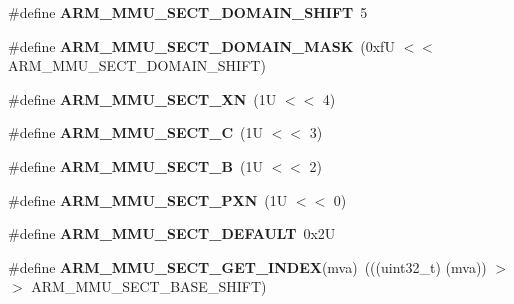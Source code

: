 \begin{DoxyCompactItemize}
\item 
\mbox{\label{group__RTEMSScoreCPUARMCP15_ga8d605c618c7295f01c30cd6ad2474426}} 
\#define {\bfseries A\+R\+M\+\_\+\+M\+M\+U\+\_\+\+S\+E\+C\+T\+\_\+\+D\+O\+M\+A\+I\+N\+\_\+\+S\+H\+I\+FT}~5
\item 
\mbox{\label{group__RTEMSScoreCPUARMCP15_ga277901cc0c1bc04e2191616e1b4e6fb5}} 
\#define {\bfseries A\+R\+M\+\_\+\+M\+M\+U\+\_\+\+S\+E\+C\+T\+\_\+\+D\+O\+M\+A\+I\+N\+\_\+\+M\+A\+SK}~(0xf\+U $<$$<$ A\+R\+M\+\_\+\+M\+M\+U\+\_\+\+S\+E\+C\+T\+\_\+\+D\+O\+M\+A\+I\+N\+\_\+\+S\+H\+I\+F\+T)
\item 
\mbox{\label{group__RTEMSScoreCPUARMCP15_gab307c4a376b707f0f7cfead169fd044f}} 
\#define {\bfseries A\+R\+M\+\_\+\+M\+M\+U\+\_\+\+S\+E\+C\+T\+\_\+\+XN}~(1\+U $<$$<$ 4)
\item 
\mbox{\label{group__RTEMSScoreCPUARMCP15_gadd8c8bbe71b02dd97b5700af1ee6c9d4}} 
\#define {\bfseries A\+R\+M\+\_\+\+M\+M\+U\+\_\+\+S\+E\+C\+T\+\_\+C}~(1\+U $<$$<$ 3)
\item 
\mbox{\label{group__RTEMSScoreCPUARMCP15_ga877b1fcf2fe5770a02682490e99441bf}} 
\#define {\bfseries A\+R\+M\+\_\+\+M\+M\+U\+\_\+\+S\+E\+C\+T\+\_\+B}~(1\+U $<$$<$ 2)
\item 
\mbox{\label{group__RTEMSScoreCPUARMCP15_ga074bffe7d934a5057cc9da19adec1302}} 
\#define {\bfseries A\+R\+M\+\_\+\+M\+M\+U\+\_\+\+S\+E\+C\+T\+\_\+\+P\+XN}~(1\+U $<$$<$ 0)
\item 
\mbox{\label{group__RTEMSScoreCPUARMCP15_gac78507eae124073eda5802dd072b90ae}} 
\#define {\bfseries A\+R\+M\+\_\+\+M\+M\+U\+\_\+\+S\+E\+C\+T\+\_\+\+D\+E\+F\+A\+U\+LT}~0x2U
\item 
\mbox{\label{group__RTEMSScoreCPUARMCP15_ga79711b4e43057d80bb4d3396e1509f84}} 
\#define {\bfseries A\+R\+M\+\_\+\+M\+M\+U\+\_\+\+S\+E\+C\+T\+\_\+\+G\+E\+T\+\_\+\+I\+N\+D\+EX}(mva)~(((uint32\+\_\+t) (mva)) $>$$>$ A\+R\+M\+\_\+\+M\+M\+U\+\_\+\+S\+E\+C\+T\+\_\+\+B\+A\+S\+E\+\_\+\+S\+H\+I\+FT)
\item 

\end{DoxyCompactItemize}
